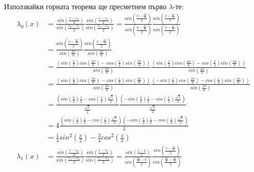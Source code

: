 \documentclass[12pt]{article}
\begin{document}
        Използвайки горната теорема ще пресметнем първо $\lambda$-те:
        \begin{align*}
        \lambda_0(x)&=\frac{sin\left(\frac{x-x_1}{2}\right)}{sin\left(\frac{x_0-x_1}{2}\right)}\frac{sin\left(\frac{x-x_2}{2}\right)}{sin\left(\frac{x_0-x_2}{2}\right)} = \frac{sin\left(\frac{x-\frac{2\pi}{3}}{2}\right)}{sin\left(\frac{0-\frac{2\pi}{3}}{2}\right)}\frac{sin\left(\frac{x-\frac{4\pi}{3}}{2}\right)}{sin\left(\frac{0-\frac{4\pi}{3}}{2}\right)}\\
        & = \frac{sin\left(\frac{x-\frac{2\pi}{3}}{2}\right)}{sin\left(\frac{2\pi}{6}\right)}\frac{sin\left(\frac{x-\frac{4\pi}{3}}{2}\right)}{sin\left(\frac{4\pi}{6}\right)}\\
        &=\frac{\left(sin\left(\frac{x}{2}\right)cos\left(\frac{2\pi}{6}\right)-cos\left(\frac{x}{2}\right)sin\left(\frac{2\pi}{6}\right)\right)}{sin\left(\frac{2\pi}{6}\right)}
        \frac{\left(sin\left(\frac{x}{2}\right)cos\left(\frac{4\pi}{6}\right)-cos\left(\frac{x}{2}\right)sin\left(\frac{4\pi}{6}\right)\right)}{sin\left(\frac{4\pi}{6}\right)}\\
        &=\frac{\left(sin\left(\frac{x}{2}\right)cos\left(\frac{2\pi}{6}\right)-cos\left(\frac{x}{2}\right)sin\left(\frac{2\pi}{6}\right)\right)}{sin\left(\frac{2\pi}{6}\right)}
        \frac{\left(-sin\left(\frac{x}{2}\right)cos\left(\frac{2\pi}{6}\right)-cos\left(\frac{x}{2}\right)sin\left(\frac{2\pi}{6}\right)\right)}{sin\left(\frac{2\pi}{6}\right)}\\
        &=\frac{\left(sin\left(\frac{x}{2}\right)\frac{1}{2}-cos\left(\frac{x}{2}\right)\frac{\sqrt3}{2}\right)}{\frac{\sqrt3}{2}}
        \frac{\left(-sin\left(\frac{x}{2}\right)\frac{1}{2}-cos\left(\frac{x}{2}\right)\frac{\sqrt3}{2}\right)}{\frac{\sqrt3}{2}}\\
        &=4\frac{\left(sin\left(\frac{x}{2}\right)\frac{1}{2}-cos\left(\frac{x}{2}\right)\frac{\sqrt3}{2}\right)
        \left(-sin\left(\frac{x}{2}\right)\frac{1}{2}-cos\left(\frac{x}{2}\right)\frac{\sqrt3}{2}\right)}{3}\\
        &=\frac{1}{4}sin^2\left(\frac{x}{2}\right)-\frac{3}{4}cos^2\left(\frac{x}{2}\right)\\
        \lambda_1(x)&=\frac{sin\left(\frac{x-x_0}{2}\right)}{sin\left(\frac{x_1-x_0}{2}\right)}\frac{sin\left(\frac{x-x_2}{2}\right)}{sin\left(\frac{x_1-x_2}{2}\right)} = \frac{sin\left(\frac{x-0}{2}\right)}{sin\left(\frac{\frac{2\pi}{3}-0}{2}\right)}\frac{sin\left(\frac{x-\frac{4\pi}{3}}{2}\right)}{sin\left(\frac{\frac{2\pi}{3}-\frac{4\pi}{3}}{2}\right)}\\

\end{align*}
\end{document}
